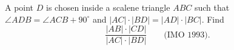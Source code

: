 A point $D$ is chosen inside a scalene triangle $ABC$ such that $\angle ADB = \angle ACB + 90^\circ$ and $|AC| \cdot |BD| = |AD| \cdot |BC|$. Find
\[ \frac{|AB| \cdot |CD|}{|AC| \cdot |BD|} \qquad \text{(IMO 1993).} \]
